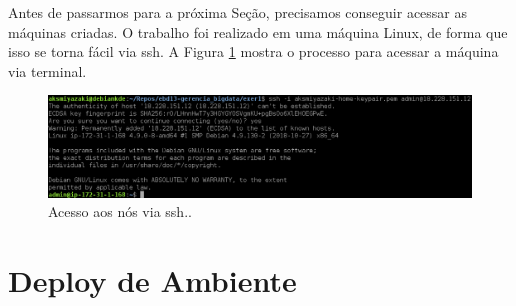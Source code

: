 \documentclass{article}
\begin{document}
Antes de passarmos para a próxima Seção, precisamos conseguir acessar as máquinas criadas. O trabalho foi realizado
em uma máquina Linux, de forma que isso se torna fácil via ssh. A Figura \ref{fig:machine_access} mostra o processo para acessar a máquina via terminal.

\begin{figure}[h]
  \includegraphics[width=\linewidth]{img/machine_access.png}
  \caption{Acesso aos nós via ssh..}
  \label{fig:machine_access}
\end{figure}



\section{Deploy de Ambiente}
\end{document}
